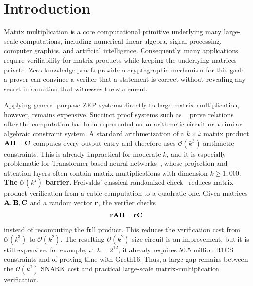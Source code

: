 \section{Introduction}
\label{sec:intro}

Matrix multiplication is a core computational primitive underlying many large-scale computations, including numerical linear algebra, signal processing, computer graphics, and artificial intelligence.  Consequently, many applications require verifiability for matrix products while keeping the underlying matrices private.  Zero-knowledge proofs provide a cryptographic mechanism for this goal:
a prover can convince a verifier that a statement is correct without revealing any secret information that witnesses the statement.

Applying general-purpose ZKP systems directly to large matrix multiplication, however, remains expensive.  Succinct proof systems such as ~\cite{groth2016size, plonk, maller2019sonic, chiesa2020marlin} prove relations after the computation has been represented as an arithmetic circuit or a similar algebraic constraint system.  
A standard arithmetization of a \(k\times k\) matrix product \(\mathbf{A}\mathbf{B}=\mathbf{C}\) computes every output
entry and therefore uses \(\mathcal{O}(k^3)\) arithmetic constraints.  This is
already impractical for moderate \(k\), and it is especially problematic for
Transformer-based neural networks~\cite{transformer, bert, GPT3}, whose projection and attention layers often
contain matrix multiplications with dimension \(k\ge 1{,}000\). \\

\noindent\textbf{The \(\mathcal{O}(k^2)\) barrier.}
Freivalds' classical randomized check~\cite{freivalds1977probabilistic} reduces
matrix-product verification from a cubic computation to a quadratic one.  Given
matrices \(\mathbf{A},\mathbf{B},\mathbf{C}\) and a random vector \(\mathbf{r}\), the
verifier checks
\[
  \mathbf{r}\mathbf{A}\mathbf{B}=\mathbf{r}\mathbf{C}
\]
instead of recomputing the full product.  This reduces the verification cost
from \(\mathcal{O}(k^3)\) to \(\mathcal{O}(k^2)\).  The resulting
\(\mathcal{O}(k^2)\)-size circuit is an improvement, but it is still expensive:
for example, at \(k=2^{12}\), it already requires \(50.5\) million R1CS
constraints and  of proving time with Groth16.  Thus, a large gap remains
between the \(\mathcal{O}(k^2)\) SNARK cost and practical large-scale
matrix-multiplication verification. \\

